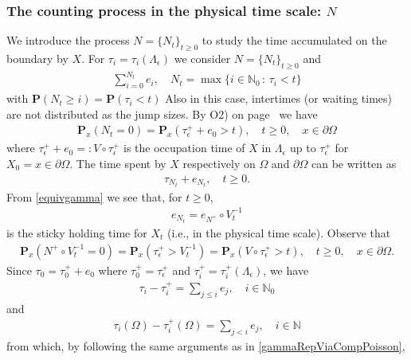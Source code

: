 \documentclass[11pt,a4paper]{article}
\begin{document}
{\subsubsection{The counting process in the physical time scale: $N$}
We introduce the process $N=\{N_t\}_{t\geq 0}$ to study the time accumulated on the boundary by $X$. For $\tau_i=\tau_i(\Lambda_\epsilon)$ we consider $N=\{N_t\}_{t\geq 0}$ and
\begin{align}
\sum_{i=0}^{N_t} e_i, \quad N_t = \max\{i \in \mathbb{N}_0\,:\, \tau_i < t\}
\label{totalAmountLTX}
\end{align}
with $\mathbf{P}(N_t \geq i) = \mathbf{P}(\tau_i < t)$  Also in this case, intertimes (or waiting times) are not distributed as the jump sizes. By O2) on page~\pageref{pageOcc12} we have
\begin{align*}
\mathbf{P}_x(N_t=0) = \mathbf{P}_x(\tau^+_\epsilon + e_0 >t), \quad t \geq 0, \quad x \in \partial \Omega
\end{align*}
where $\tau^+_\epsilon + e_0 =: V \circ \tau^+_\epsilon$ is the occupation time of $X$ in $\Lambda_\epsilon$ up to $\tau^+_\epsilon$ for $X_0=x \in \partial \Omega$. The time spent by $X$ respectively on $\Omega$ and $\partial \Omega$ can be written as
\begin{align*}
\tau_{N_t} + e_{N_t}, \quad t \geq 0.
\end{align*}
From \eqref{equivgamma} we see that, for $t\geq 0$, 
\begin{align*}
e_{N_t} = e_{N^+} \circ V^{-1}_t
\end{align*}
is the sticky holding time for $X_t$ (i.e., in the physical time scale). Observe that
\begin{align*}
\mathbf{P}_x(N^+ \circ V^{-1}_t = 0) = \mathbf{P}_x(\tau^+_\epsilon > V^{-1}_t) = \mathbf{P}_x(V \circ \tau^+_\epsilon >t), \quad t \geq 0, \quad x \in \partial \Omega.
\end{align*}
Since $\tau_0 = \tau^+_0 + e_0$ where $\tau^+_0 = \tau^+_\epsilon$ and $\tau^+_i=\tau^+_i(\Lambda_\epsilon)$, we have
\begin{align}
\tau_i - \tau^+_i = \sum_{j \leq i } e_j, \quad i \in \mathbb{N}_0
\label{SUMe}
\end{align} 
and
\begin{align*}
\tau_i(\Omega) - \tau^+_i(\Omega) = \sum_{j < i } e_j, \quad i \in \mathbb{N}
\end{align*}
from which, by following the same arguments as in \eqref{gammaRepViaCompPoisson},  
\begin{align*}

\end{align*}}
\end{document}

